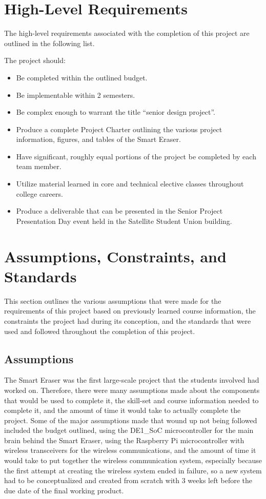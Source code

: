  \section{High-Level Requirements}
The high-level requirements associated with the completion of this project are outlined in the following list. \par
\setlength{\parindent}{2.5ex} The project should:
\begin{itemize}
\item Be completed within the outlined budget.
\item Be implementable within 2 semesters.
\item Be complex enough to warrant the title ``senior design project''.
\item Produce a complete Project Charter outlining the various project information, figures, and tables of the Smart Eraser.
\item Have significant, roughly equal portions of the project be completed by each team member.
\item Utilize material learned in core and technical elective classes throughout college careers.
\item Produce a deliverable that can be presented in the Senior Project Presentation Day event held in the Satellite Student Union building.
\end{itemize}

\section{Assumptions, Constraints, and Standards}

This section outlines the various assumptions that were made for the requirements of this project based on previously learned course information, the constraints the project had during its conception, and the standards that were used and followed throughout the completion of this project.\par

\subsection{Assumptions}
The Smart Eraser was the first large-scale project that the students involved had worked on. Therefore, there were many assumptions made about the components that would be used to complete it, the skill-set and course information needed to complete it, and the amount of time it would take to actually complete the project. Some of the major assumptions made that wound up not being followed included the budget outlined, using the DE1\_SoC microcontroller for the main brain behind the Smart Eraser, using the Raspberry Pi microcontroller with wireless transceivers for the wireless communications, and the amount of time it would take to put together the wireless communication system, especially because the first attempt at creating the wireless system ended in failure, so a new system had to be conceptualized and created from scratch with 3 weeks left before the due date of the final working product.

